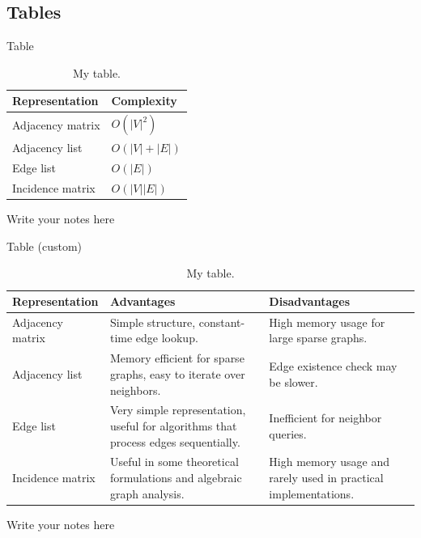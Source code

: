 \documentclass[aspectratio=169]{beamer}
\begin{document}
    \subsection{Tables}
        \begin{frame}{Table}
            \begin{table}[htp!]
                \centering
                \caption{My table.}
                \begin{tabular}{ll}\toprule
                    Representation & Complexity \\\midrule
                    Adjacency matrix & $O(|V|^2)$ \\
                    Adjacency list & $O(|V| + |E|)$ \\
                    Edge list & $O(|E|)$ \\
                    Incidence matrix & $O(|V||E|)$ \\\bottomrule
                \end{tabular}
            \end{table}

            \begin{note}
                {Write your notes here}
            \end{note}
        \end{frame}

        \begin{frame}{Table (custom)}
            \begin{table}[htp!]
                \scriptsize
                \centering
                \caption{My table.}
                \begin{tabular}{p{2.2cm}p{4cm}p{4cm}}\toprule
                    Representation & Advantages & Disadvantages \\\midrule
                    Adjacency matrix & Simple structure, constant-time edge lookup. & High memory usage for large sparse graphs. \\
                    Adjacency list & Memory efficient for sparse graphs, easy to iterate over neighbors. & Edge existence check may be slower. \\
                    Edge list & Very simple representation, useful for algorithms that process edges sequentially. & Inefficient for neighbor queries.  \\
                    Incidence matrix & Useful in some theoretical formulations and algebraic graph analysis. & High memory usage and rarely used in practical implementations. \\\bottomrule
                \end{tabular}
            \end{table}

            \begin{note}
                {Write your notes here}
            \end{note}
        \end{frame}
\end{document}
